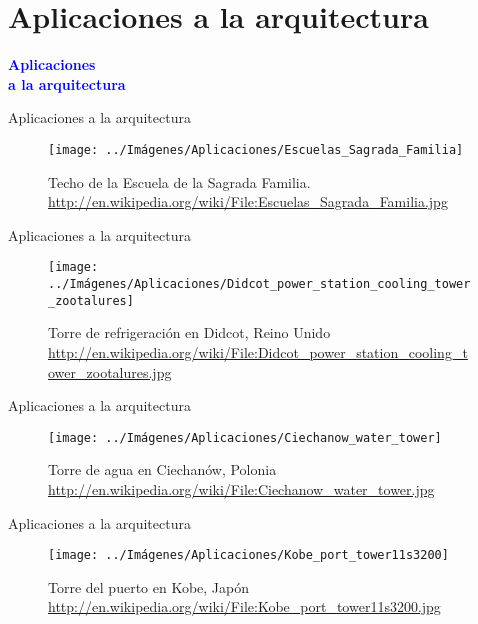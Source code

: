 \documentclass[10pt]{beamer}
\begin{document}
	\section{Aplicaciones a la arquitectura}
	
	\begin{frame}
		\begin{center}
			\Huge\textbf{\textsf{\textcolor{blue}{Aplicaciones \\ a la arquitectura}}}
		\end{center}
	\end{frame}

	\begin{frame}{Aplicaciones a la arquitectura}	
		\begin{figure}
			\centering
			\texttt{[image: ../Imágenes/Aplicaciones/Escuelas\_Sagrada\_Familia]}
			\caption{Techo de la Escuela de la Sagrada Familia. \url{http://en.wikipedia.org/wiki/File:Escuelas_Sagrada_Familia.jpg}}
			\label{fig:Sagrada-familia}
		\end{figure}	
	\end{frame}
	
	\begin{frame}{Aplicaciones a la arquitectura}	
		\begin{figure}
			\centering
			\texttt{[image: ../Imágenes/Aplicaciones/Didcot\_power\_station\_cooling\_tower\_zootalures]}
			\caption{Torre de refrigeración en Didcot, Reino Unido \url{http://en.wikipedia.org/wiki/File:Didcot_power_station_cooling_tower_zootalures.jpg}}
			\label{fig:Didicot}
		\end{figure}	
	\end{frame}
	
	\begin{frame}{Aplicaciones a la arquitectura}	
		\begin{figure}
			\centering
			\texttt{[image: ../Imágenes/Aplicaciones/Ciechanow\_water\_tower]}
			\caption{Torre de agua en Ciechanów, Polonia \url{http://en.wikipedia.org/wiki/File:Ciechanow_water_tower.jpg}}
			\label{fig:torre-agua}
		\end{figure}	
	\end{frame}
	
	\begin{frame}{Aplicaciones a la arquitectura}	
		\begin{figure}
			\centering
			\texttt{[image: ../Imágenes/Aplicaciones/Kobe\_port\_tower11s3200]}
			\caption{Torre del puerto en Kobe, Japón \url{http://en.wikipedia.org/wiki/File:Kobe_port_tower11s3200.jpg}}
			\label{fig:torre-japon}
		\end{figure}	
	\end{frame}
	
\end{document}
